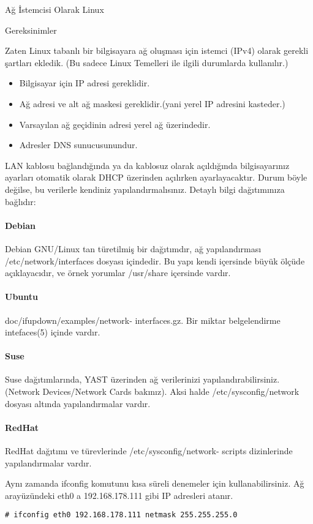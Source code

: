 \begin{section}{Ağ İstemcisi Olarak Linux}
\begin{subsection}{Gereksinimler}

Zaten Linux tabanlı bir bilgisayara ağ oluşması için istemci (IPv4) olarak gerekli şartları ekledik. (Bu sadece Linux Temelleri ile ilgili durumlarda kullanılır.)

\begin{itemize}
\item Bilgisayar için IP adresi gereklidir.
\item Ağ adresi ve alt ağ maskesi gereklidir.(yani yerel IP adresini kasteder.)
\item Varsayılan ağ geçidinin adresi yerel ağ üzerindedir.
\item Adresler DNS sunucusunundur.
\end{itemize}

LAN kablosu bağlandığında ya da kablosuz olarak açıldığında bilgisayarınız ayarları otomatik olarak DHCP üzerinden açılırken ayarlayacaktır. Durum böyle  değilse, bu verilerle kendiniz yapılandırmalısınız. Detaylı bilgi dağıtımınıza bağlıdır:

\paragraph{Debian}{Debian GNU/Linux tan türetilmiş bir dağıtımdır, ağ yapılandırması /etc/network/interfaces dosyası içindedir.
Bu yapı kendi içersinde büyük ölçüde açıklayacıdır, ve örnek yorumlar /usr/share içersinde vardır.}
\paragraph{Ubuntu}{doc/ifupdown/examples/network- interfaces.gz. Bir miktar belgelendirme intefaces(5) içinde vardır.}
\paragraph{Suse}{Suse dağıtımlarında, YAST üzerinden ağ verilerinizi yapılandırabilirsiniz. (Network Devices/Network Cards bakınız). Aksi halde  /etc/sysconfig/network dosyası altında yapılandırmalar vardır.}
\paragraph{RedHat}{RedHat dağıtımı ve türevlerinde /etc/sysconfig/network- scripts dizinlerinde yapılandırmalar vardır.}

Aynı zamanda ifconfig komutunu kısa süreli denemeler için kullanabilirsiniz. Ağ arayüzündeki eth0 a 192.168.178.111 gibi IP adresleri atanır. 
\begin{verbatim}
# ifconfig eth0 192.168.178.111 netmask 255.255.255.0
\end{verbatim}


\end{subsection}
\end{section}
